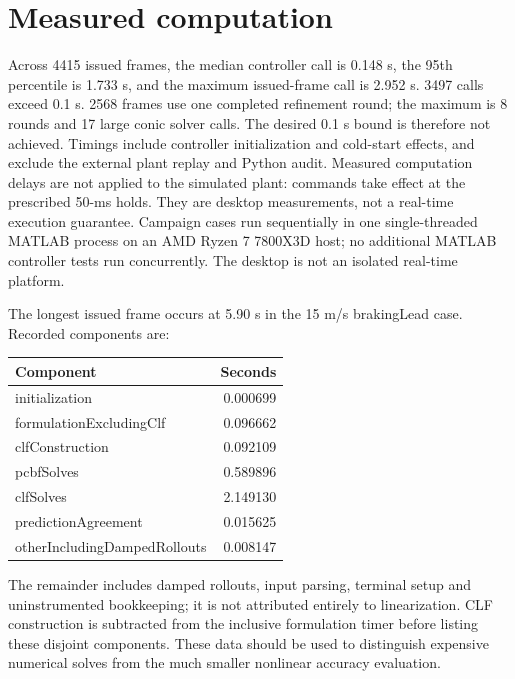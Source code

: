 \documentclass[11pt]{article}
\begin{document}
\section{Measured computation}
Across 4415 issued frames, the median controller call is 0.148 s,
the 95th percentile is 1.733 s, and the maximum issued-frame call is 2.952 s.
3497 calls exceed 0.1 s. 2568 frames use one completed refinement
round; the maximum is 8 rounds and 17 large conic solver
calls. The desired 0.1 s bound is therefore not achieved. Timings include
controller initialization and cold-start effects, and exclude the external
plant replay and Python audit. Measured computation delays are not applied
to the simulated plant: commands take effect at the prescribed 50-ms holds. They are desktop measurements, not a real-time
execution guarantee. Campaign cases run sequentially in one single-threaded
MATLAB process on an AMD Ryzen 7 7800X3D host; no additional MATLAB
controller tests run concurrently. The desktop is not an isolated real-time
platform.

The longest issued frame occurs at 5.90 s in the 15 m/s
brakingLead case. Recorded components are:
\begin{center}\small\begin{tabular}{lr}\toprule Component & Seconds\\\midrule
initialization & 0.000699 \\
formulationExcludingClf & 0.096662 \\
clfConstruction & 0.092109 \\
pcbfSolves & 0.589896 \\
clfSolves & 2.149130 \\
predictionAgreement & 0.015625 \\
otherIncludingDampedRollouts & 0.008147 \\
\bottomrule\end{tabular}\end{center}
The remainder includes damped rollouts, input parsing, terminal setup and
uninstrumented bookkeeping; it is not attributed entirely to linearization.
CLF construction is subtracted from the inclusive formulation timer before
listing these disjoint components. These data should
be used to distinguish expensive numerical solves from the much smaller
nonlinear accuracy evaluation.
\end{document}
